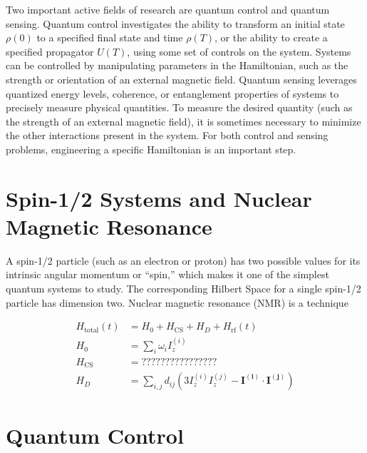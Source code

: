 \lipsum[1]

Two important active fields of research are quantum control and quantum sensing. Quantum control investigates the ability to transform an initial state $\rho(0)$ to a specified final state and time $\rho(T)$, or the ability to create a specified propagator $U(T)$, using some set of controls on the system.\cite{Dong_2010} Systems can be controlled by manipulating parameters in the Hamiltonian, such as the strength or orientation of an external magnetic field.
Quantum sensing leverages quantized energy levels, coherence, or entanglement properties of systems to precisely measure physical quantities. To measure the desired quantity (such as the strength of an external magnetic field), it is sometimes necessary to minimize the other interactions present in the system. For both control and sensing problems, engineering a specific Hamiltonian is an important step.

\section{Spin-1/2 Systems and Nuclear Magnetic Resonance}

A spin-1/2 particle (such as an electron or proton) has two possible values for its intrinsic angular momentum or ``spin,'' which makes it one of the simplest quantum systems to study. The corresponding Hilbert Space for a single spin-1/2 particle has dimension two.
Nuclear magnetic resonance (NMR) is a technique %

\begin{align}\label{eq:nmr-ham}
    H_\text{total}(t) &= H_0 + H_\text{CS} + H_D + H_\text{rf}(t) \\
    H_0 &= \sum_i \omega_i I_z^{(i)} \\
    H_\text{CS} &= ???????????????? \\
    H_D &= \sum_{i,j} d_{ij} \left( 3I_z^{(i)}I_z^{(j)} - \mathbf{I^{(i)}} \cdot \mathbf{I^{(j)}} \right)
\end{align}

\lipsum[2]

\section{Quantum Control}


